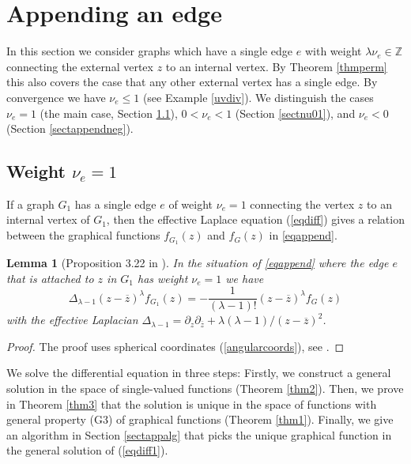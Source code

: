 \documentclass[oneside]{amsart}
\newcommand{\ZZ}{{\mathbb Z}}
\newcommand{\zz}{{\overline{z}}}
\theoremstyle{plain}
\newtheorem{lem}[thm]{Lemma}
\begin{document}
\section{Appending an edge}\label{sectappedge}
In this section we consider graphs which have a single edge $e$ with weight $\lambda\nu_e\in\ZZ$ connecting the external vertex $z$ to an internal vertex.
By Theorem \ref{thmperm} this also covers the case that any other external vertex has a single edge.
By convergence we have $\nu_e\leq 1$ (see Example \ref{uvdiv}). We distinguish the cases $\nu_e=1$ (the main case, Section \ref{sectnu1}),
$0<\nu_e<1$ (Section \ref{sectnu01}), and $\nu_e<0$ (Section \ref{sectappendneg}).

\subsection{Weight \texorpdfstring{$\nu_e=1$}{nu(e)=1}}\label{sectnu1}
If a graph $G_1$ has a single edge $e$ of weight $\nu_e=1$ connecting the vertex $z$ to an internal vertex of $G_1$,
then the effective Laplace equation (\ref{eqdiff}) gives a relation between the graphical functions $f_{G_1}(z)$ and $f_G(z)$ in \eqref{eqappend}.

\begin{lem}[Proposition 3.22 in \cite{gf}]\label{lemdiff}
In the situation of \eqref{eqappend} where the edge $e$ that is attached to $z$ in $G_1$ has weight $\nu_e=1$ we have
\begin{equation}\label{eqdiff1}
\Delta_{\lambda-1}(z-\zz)^\lambda f_{G_1}(z)=-\frac{1}{(\lambda-1)!}(z-\zz)^\lambda f_G(z)
\end{equation}
with the effective Laplacian $\Delta_{\lambda-1}=\partial_z\partial_\zz+\lambda(\lambda-1)/(z-\zz)^2$.
\end{lem}
\begin{proof}
The proof uses spherical coordinates (\ref{angularcoords}), see \cite{gf}.
\end{proof}

We solve the differential equation in three steps: Firstly, we construct a general solution in the space of single-valued functions (Theorem \ref{thm2}).
Then, we prove in Theorem \ref{thm3} that the solution is unique in the space of functions with general property (G3) of graphical functions (Theorem \ref{thm1}).
Finally, we give an algorithm in Section \ref{sectappalg} that picks the unique graphical function in the general solution of (\ref{eqdiff1}).
\end{document}
